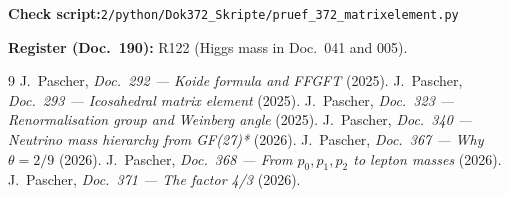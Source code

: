 \medskip
\noindent\textbf{Check script:}\newline\texttt{2/python/Dok372\_Skripte/pruef\_372\_matrixelement.py}

\medskip
\noindent\textbf{Register (Doc.~190):} R122 (Higgs mass in Doc.~041 and 005).

\begin{thebibliography}{9}
 J.~Pascher, \emph{Doc.~292 --- Koide formula and FFGFT} (2025).
 J.~Pascher, \emph{Doc.~293 --- Icosahedral matrix element} (2025).
 J.~Pascher, \emph{Doc.~323 --- Renormalisation group and Weinberg angle} (2025).
 J.~Pascher, \emph{Doc.~340 --- Neutrino mass hierarchy from GF(27)*} (2026).
 J.~Pascher, \emph{Doc.~367 --- Why $\theta = 2/9$} (2026).
 J.~Pascher, \emph{Doc.~368 --- From $p_0,p_1,p_2$ to lepton masses} (2026).
 J.~Pascher, \emph{Doc.~371 --- The factor 4/3} (2026).
\end{thebibliography}
